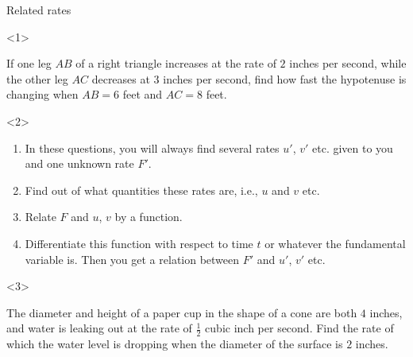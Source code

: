 \begin{frame}{Related rates}

\begin{onlyenv}<1>

\begin{example}
If one leg $AB$ of a right triangle increases at the rate of $2$
inches per second, while the other leg $AC$ decreases at $3$ inches
per second, find how fast the hypotenuse is changing when $AB=6$
feet and $AC=8$ feet.

\begin{center}
\par\end{center}

\end{example}

\end{onlyenv}



\begin{onlyenv}<2>

\begin{enumerate}
\item In these questions, you will always find several rates $u'$, $v'$
etc. given to you and one unknown rate $F'$.
\item Find out of what quantities these rates are, i.e., $u$ and $v$ etc.
\item Relate $F$ and $u$, $v$ by a function.
\item Differentiate this function with respect to time $t$ or whatever
the fundamental variable is. Then you get a relation between $F'$
and $u'$, $v'$ etc.
\end{enumerate}
\end{onlyenv}



\begin{onlyenv}<3>

\begin{example}
The diameter and height of a paper cup in the shape of a cone are
both $4$ inches, and water is leaking out at the rate of $\frac{1}{2}$
cubic inch per second. Find the rate of which the water level is dropping
when the diameter of the surface is $2$ inches.
\end{example}

\end{onlyenv}

\end{frame}




